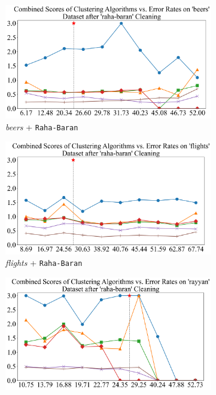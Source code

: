 \documentclass[10pt]{article} %
\numberwithin{equation}{section}
\begin{document}
\begin{figure}[htbp]
  \begin{subfigure}{0.24\linewidth}
    \centering
    \includegraphics[width=\linewidth]{raha-baran_beers_combined_scores.png}
    \caption{\textit{beers} + \texttt{Raha-Baran}}
    \label{fig:raha_baran_beers}
  \end{subfigure}
  \hfill
  \begin{subfigure}{0.24\linewidth}
    \centering
    \includegraphics[width=\linewidth]{raha-baran_flights_combined_scores.png}
    \caption{\textit{flights} + \texttt{Raha-Baran}}
    \label{fig:raha_baran_flights}
  \end{subfigure}
  \hfill
  \begin{subfigure}{0.24\linewidth}
    \centering
    \includegraphics[width=\linewidth]{raha-baran_rayyan_combined_scores.png}

\end{subfigure}
\end{figure}
\end{document}
